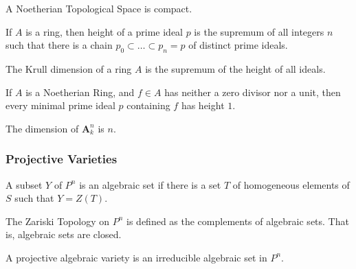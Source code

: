 \documentclass[crop=false,class=article,oneside]{standalone}
\begin{document}
            \begin{theorem}
                A Noetherian Topological Space is compact.
            \end{theorem}
            \begin{definition}
                If $A$ is a ring, then height of a prime
                ideal $p$ is the supremum of all integers $n$
                such that there is a chain
                $p_{0}\subset\hdots\subset{p_{n}}=p$
                of distinct prime ideals.
            \end{definition}
            \begin{definition}
                The Krull dimension of a ring $A$ is the
                supremum of the height of all ideals.
            \end{definition}
            \begin{theorem}
                If $A$ is a Noetherian Ring, and $f\in A$
                has neither a zero divisor nor a unit,
                then every minimal prime ideal $p$
                containing $f$ has height $1$.
            \end{theorem}
            \begin{theorem}
                The dimension of $\textbf{A}_{k}^{n}$ is $n$.
            \end{theorem}
        \subsubsection{Projective Varieties}
            \begin{definition}
                A subset $Y$ of $P^n$ is an algebraic
                set if there is a set $T$ of homogeneous
                elements of $S$ such that $Y=Z(T)$.
            \end{definition}
            \begin{definition}
                The Zariski Topology on $P^n$ is defined
                as the complements of algebraic sets.
                That is, algebraic sets are closed.
            \end{definition}
            \begin{definition}
                A projective algebraic variety is an
                irreducible algebraic set in $P^{n}$.
            \end{definition}
\end{document}
